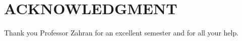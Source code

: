 \documentclass[letterpaper, 10 pt, conference]{ieeeconf}  %
\begin{document}

\addtolength{\textheight}{-12cm}   %



\section*{ACKNOWLEDGMENT}

Thank you Professor Zahran for an excellent semester and for all your help.
\end{document}
